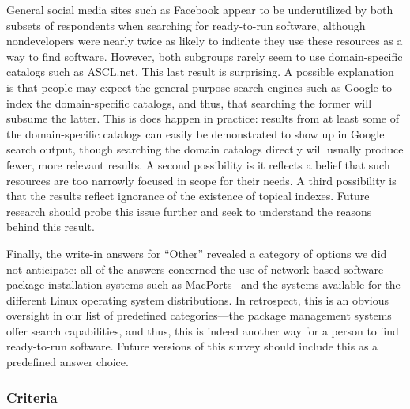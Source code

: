 \documentclass{casicswhitepaper}
\begin{document}
General social media sites such as Facebook appear to be underutilized by both subsets of respondents when searching for ready-to-run software, although nondevelopers were nearly twice as likely to indicate they use these resources as a way to find software.  However, both subgroups rarely seem to use domain-specific catalogs such as ASCL.net.  This last result is surprising.  A possible explanation is that people may expect the general-purpose search engines such as Google to index the domain-specific catalogs, and thus, that searching the former will subsume the latter.  This is does happen in practice: results from at least some of the domain-specific catalogs can easily be demonstrated to show up in Google search output, though searching the domain catalogs directly will usually produce fewer, more relevant results.  A second possibility is it reflects a belief that such resources are too narrowly focused in scope for their needs.  A third possibility is that the results reflect ignorance of the existence of topical indexes.  Future research should probe this issue further and seek to understand the reasons behind this result.

Finally, the write-in answers for ``Other'' revealed a category of options we did not anticipate: all of the answers concerned the use of network-based software package installation systems such as MacPorts~\cite{fuller2002macports} and the systems available for the different Linux operating system distributions.  In retrospect, this is an obvious oversight in our list of predefined categories---the package management systems offer search capabilities, and thus, this is indeed another way for a person to find ready-to-run software.  Future versions of this survey should include this as a predefined answer choice.


\subsubsection{Criteria}
\label{criteria-ready-to-use}
\end{document}
